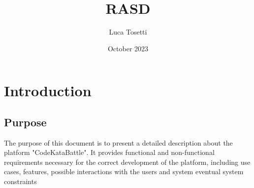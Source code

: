 \documentclass{article}
\title{RASD}
\author{Luca Tosetti}
\date{October 2023}
\begin{document}
\maketitle

\tableofcontents

\section{Introduction}
    \subsection{Purpose}
        The purpose of this document is to present a detailed description about the platform "CodeKataBattle". It provides functional and non-functional requirements necessary for the correct development of the platform, including use cases, features, possible interactions with the users and system eventual system constraints
\end{document}
